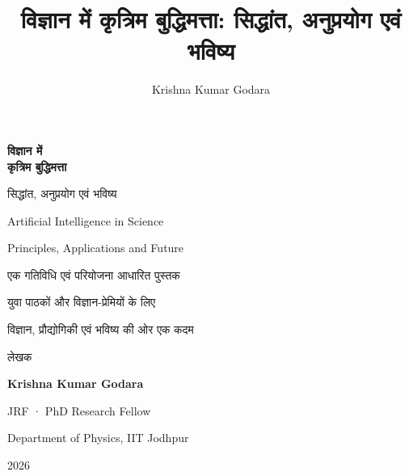 \documentclass[12pt,openany]{book}
\title{विज्ञान में कृत्रिम बुद्धिमत्ता: सिद्धांत, अनुप्रयोग एवं भविष्य}
\author{Krishna Kumar Godara}
\date{}
\begin{document}


\begin{titlepage}
\centering
\vspace*{2cm}
{\sffamily\bfseries\Huge\color{aiblue} विज्ञान में\\[4pt] कृत्रिम बुद्धिमत्ता\par}
\vspace{8pt}
{\sffamily\large\color{aiblue} सिद्धांत, अनुप्रयोग एवं भविष्य\par}
\vspace{10pt}
{\sffamily\Large\color{aigrey} Artificial Intelligence in Science\par}
\vspace{2pt}
{\sffamily\normalsize\color{aigrey} Principles, Applications and Future\par}
\vspace{1.2cm}
{\large एक गतिविधि एवं परियोजना आधारित पुस्तक\par}
\vspace{0.4cm}
{\large युवा पाठकों और विज्ञान-प्रेमियों के लिए\par}
\vfill
{\sffamily\large\color{aiblue} विज्ञान, प्रौद्योगिकी एवं भविष्य की ओर एक कदम\par}
\vspace{1.6cm}
{\large लेखक\par}
\vspace{2pt}
{\sffamily\bfseries\Large\color{aiblue} Krishna Kumar Godara\par}
\vspace{2pt}
{\normalsize JRF · PhD Research Fellow\par}
{\normalsize Department of Physics, IIT Jodhpur\par}
\vspace{1.2cm}
{\color{aigrey} 2026}
\end{titlepage}



\frontmatter



\tableofcontents
\listoffigures
\listoftables

\mainmatter













\cleardoublepage
{}
\renewcommand{\indexname}{अनुक्रमणिका (Index)}
\printindex


\end{document}
